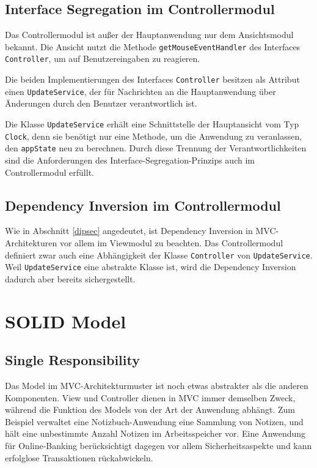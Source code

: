 \documentclass{vldb}
\begin{document}
\subsection{Interface Segregation im Controllermodul}
Das Controllermodul ist außer der Hauptanwendung nur dem Ansichtsmodul bekannt. Die Ansicht nutzt die Methode \texttt{getMouseEventHandler} des Interfaces \texttt{Con\-troller}, um auf Benutzereingaben zu re\-agie\-ren.

Die beiden Implementierungen des Interfaces \texttt{Controller} besitzen als Attribut einen \texttt{UpdateService}, der für Nach\-rich\-ten an die Hauptanwendung über Änderungen durch den Benutzer verantwortlich ist.

Die Klasse \texttt{UpdateService} erhält eine Schnittstelle der Hauptansicht vom Typ \texttt{Clock}, denn sie benötigt nur eine Me\-thode, um die Anwendung zu veranlassen, den \texttt{appState} neu zu berechnen. Durch diese Trennung der Ver\-ant\-wort\-lich\-kei\-ten sind die Anforderungen des Interface-Segregation-Prinzips auch im Controllermodul erfüllt.

\subsection{Dependency Inversion im Controllermodul}
Wie in Abschnitt \ref{dipsec} angedeutet, ist Dependency Inversion in MVC-Architekturen vor allem im Viewmodul zu be\-ach\-ten. Das Controllermodul definiert zwar auch eine Ab\-hän\-gig\-keit der Klasse \texttt{Controller} von \texttt{UpdateService}. Weil \texttt{UpdateService} eine abstrakte Klasse ist, wird die Dependency Inversion dadurch aber bereits sichergestellt.

\section{SOLID Model}
\label{solidmodelsec}
\subsection{Single Responsibility}
Das Model im MVC-Architekturmuster ist noch etwas abstrakter als die anderen Komponenten. View und Controller dienen in MVC immer demselben Zweck, während die Funktion des Models von der Art der Anwendung abhängt. Zum Beispiel verwaltet eine Notizbuch-Anwendung eine Sammlung von Notizen, und hält eine unbestimmte Anzahl Notizen im Arbeitsspeicher vor. Eine Anwendung für Online-Banking berücksichtigt dagegen vor allem Sicherheitsaspekte und kann erfolglose Transaktionen rückabwickeln.
\end{document}
